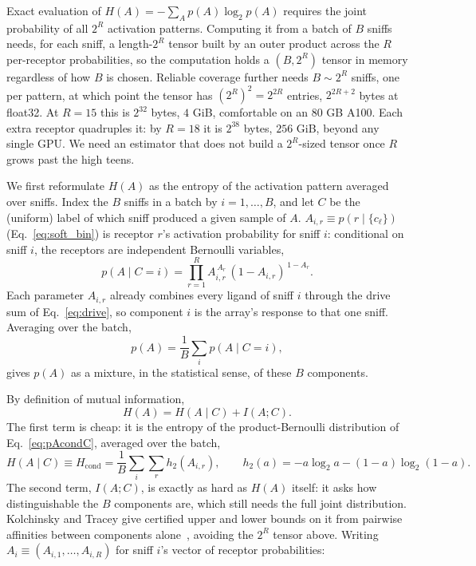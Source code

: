 \documentclass[aps,pre,superscriptaddress,floatfix,longbibliography,linenumbers]{revtex4-2}
\begin{document}
Exact evaluation of $H(A) = -\sum_A p(A)\log_2 p(A)$ requires the joint
probability of all $2^R$ activation patterns. Computing it from a batch of
$B$ sniffs needs, for each sniff, a length-$2^R$ tensor built by an outer
product across the $R$ per-receptor probabilities, so the computation
holds a $(B,2^R)$ tensor in memory regardless of how $B$ is chosen.
Reliable coverage further needs $B\sim2^R$ sniffs, one per pattern, at
which point the tensor has $(2^R)^2=2^{2R}$ entries, $2^{2R+2}$ bytes at
float32. At $R=15$ this is $2^{32}$ bytes, $4$ GiB, comfortable on an
80 GB A100. Each extra receptor quadruples it: by $R=18$ it is $2^{38}$
bytes, $256$ GiB, beyond any single GPU. We need an estimator that does not
build a $2^R$-sized tensor once $R$ grows past the high teens.

We first reformulate $H(A)$ as the entropy of the activation pattern
averaged over sniffs. Index the $B$ sniffs in a batch by $i=1,\dots,B$, and
let $C$ be the (uniform) label of which sniff produced a given sample of
$A$. $A_{i,r}\equiv p(r\mid\{c_\ell\})$ (Eq.~\eqref{eq:soft_bin}) is
receptor $r$'s activation probability for sniff $i$: conditional on sniff
$i$, the receptors are independent Bernoulli variables,
\begin{equation}
p(A\mid C=i) = \prod_{r=1}^R A_{i,r}^{\,A_r}\,(1-A_{i,r})^{\,1-A_r}.
\label{eq:pAcondC}
\end{equation}
Each parameter $A_{i,r}$ already combines every ligand of sniff $i$ through
the drive sum of Eq.~\eqref{eq:drive}, so component $i$ is the array's
response to that one sniff. Averaging over the batch,
\begin{equation}
p(A) = \frac1B\sum_i p(A\mid C=i),
\label{eq:pA_mixture}
\end{equation}
gives $p(A)$ as a mixture, in the statistical sense, of these $B$
components.

By definition of mutual information,
\begin{equation}
H(A) = H(A\mid C) + I(A;C).
\label{eq:mixture_decomp}
\end{equation}
The first term is cheap: it is the entropy of the product-Bernoulli
distribution of Eq.~\eqref{eq:pAcondC}, averaged over the batch,
\begin{equation}
H(A\mid C) \equiv H_\text{cond} = \frac{1}{B}\sum_i \sum_r h_2(A_{i,r}),
\qquad
h_2(a) = -a\log_2 a - (1-a)\log_2(1-a).
\label{eq:hcond}
\end{equation}
The second term, $I(A;C)$, is exactly as hard as $H(A)$ itself: it asks how
distinguishable the $B$ components are, which still needs the full joint
distribution. Kolchinsky and Tracey give certified upper and lower bounds
on it from pairwise affinities between components
alone~\cite{kolchinsky_estimating_2017}, avoiding the $2^R$ tensor above.
Writing $A_i\equiv(A_{i,1},\dots,A_{i,R})$ for sniff $i$'s vector of
receptor probabilities:
\end{document}

